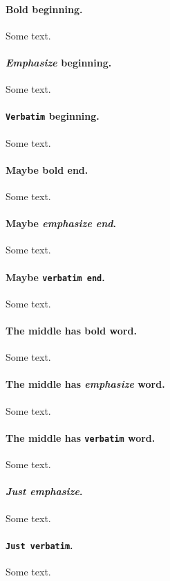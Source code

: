 \documentclass[%
oneside,                 %
final,                   %
10pt]{article}
\theoremstyle{definition}
\begin{document}
\begin{enumerate}
\paragraph{\textbf{Bold} beginning.}
Some text.

\paragraph{\emph{Emphasize} beginning.}
Some text.

\paragraph{\texttt{Verbatim} beginning.}
Some text.

\paragraph{Maybe \textbf{bold end}.}
Some text.

\paragraph{Maybe \emph{emphasize end}.}
Some text.

\paragraph{Maybe \texttt{verbatim end}.}
Some text.

\paragraph{The middle has \textbf{bold} word.}
Some text.

\paragraph{The middle has \emph{emphasize} word.}
Some text.

\paragraph{The middle has \texttt{verbatim} word.}
Some text.

\paragraph{\emph{Just emphasize}.}
Some text.

\paragraph{\texttt{Just verbatim}.}
Some text.


\end{enumerate}
\end{document}
